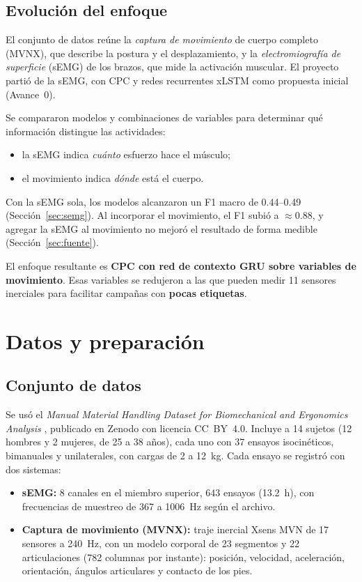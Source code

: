\documentclass[letterpaper,11pt]{article}
\begin{document}
\subsection{Evolución del enfoque}
El conjunto de datos reúne la \emph{captura de movimiento} de cuerpo completo (MVNX), que describe la postura y el desplazamiento, y la \emph{electromiografía de superficie} (sEMG) de los brazos, que mide la activación muscular. El proyecto partió de la sEMG, con CPC y redes recurrentes xLSTM \parencite{beck2024} como propuesta inicial (Avance~0).

Se compararon modelos y combinaciones de variables para determinar qué información distingue las actividades:
\begin{itemize}
  \item la sEMG indica \emph{cuánto} esfuerzo hace el músculo;
  \item el movimiento indica \emph{dónde} está el cuerpo.
\end{itemize}
Con la sEMG sola, los modelos alcanzaron un F1 macro de 0.44--0.49 (Sección~\ref{sec:semg}). Al incorporar el movimiento, el F1 subió a $\approx 0.88$, y agregar la sEMG al movimiento no mejoró el resultado de forma medible (Sección~\ref{sec:fuente}).

El enfoque resultante es \textbf{CPC con red de contexto GRU sobre variables de movimiento}. Esas variables se redujeron a las que pueden medir 11 sensores inerciales para facilitar campañas con \textbf{pocas etiquetas}.

\section{Datos y preparación}

\subsection{Conjunto de datos}
Se usó el \emph{Manual Material Handling Dataset for Biomechanical and Ergonomics Analysis} \parencite{bassani2021dataset}, publicado en Zenodo con licencia CC~BY~4.0. Incluye a 14 sujetos (12 hombres y 2 mujeres, de 25 a 38 años), cada uno con 37 ensayos isocinéticos, bimanuales y unilaterales, con cargas de 2 a 12~kg. Cada ensayo se registró con dos sistemas:

\begin{itemize}
  \item \textbf{sEMG:} 8 canales en el miembro superior, 643 ensayos (13.2~h), con frecuencias de muestreo de 367 a 1006~Hz según el archivo.
  \item \textbf{Captura de movimiento (MVNX):} traje inercial Xsens MVN de 17 sensores a 240~Hz, con un modelo corporal de 23 segmentos y 22 articulaciones (782 columnas por instante): posición, velocidad, aceleración, orientación, ángulos articulares y contacto de los pies.
\end{itemize}
\end{document}
